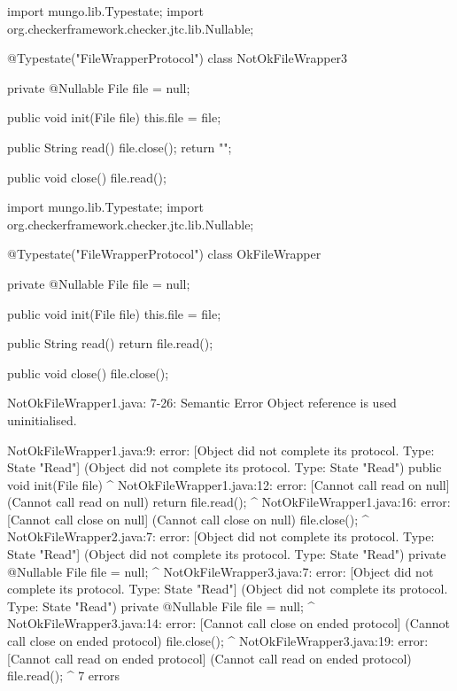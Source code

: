 \begin{code}
import mungo.lib.Typestate;
import org.checkerframework.checker.jtc.lib.Nullable;

@Typestate("FileWrapperProtocol")
class NotOkFileWrapper3 {

  private @Nullable File file = null;

  public void init(File file) {
    this.file = file;
  }

  public String read() {
    file.close();
    return "";
  }

  public void close() {
    file.read();
  }

}\end{code}

\begin{code}
import mungo.lib.Typestate;
import org.checkerframework.checker.jtc.lib.Nullable;

@Typestate("FileWrapperProtocol")
class OkFileWrapper {

  private @Nullable File file = null;

  public void init(File file) {
    this.file = file;
  }

  public String read() {
    return file.read();
  }

  public void close() {
    file.close();
  }

}\end{code}

\lstset{language=,caption=Mungo's output}
\begin{code}

NotOkFileWrapper1.java: 7-26: Semantic Error
		Object reference is used uninitialised.
\end{code}

\lstset{language=,caption=Our tool's output}
\begin{code}
NotOkFileWrapper1.java:9: error: [Object did not complete its protocol. Type: State "Read"] (Object did not complete its protocol. Type: State "Read")
  public void init(File file) {}
                        ^
NotOkFileWrapper1.java:12: error: [Cannot call read on null] (Cannot call read on null)
    return file.read();
                    ^
NotOkFileWrapper1.java:16: error: [Cannot call close on null] (Cannot call close on null)
    file.close();
              ^
NotOkFileWrapper2.java:7: error: [Object did not complete its protocol. Type: State "Read"] (Object did not complete its protocol. Type: State "Read")
  private @Nullable File file = null;
                         ^
NotOkFileWrapper3.java:7: error: [Object did not complete its protocol. Type: State "Read"] (Object did not complete its protocol. Type: State "Read")
  private @Nullable File file = null;
                         ^
NotOkFileWrapper3.java:14: error: [Cannot call close on ended protocol] (Cannot call close on ended protocol)
    file.close();
              ^
NotOkFileWrapper3.java:19: error: [Cannot call read on ended protocol] (Cannot call read on ended protocol)
    file.read();
             ^
7 errors
\end{code}

